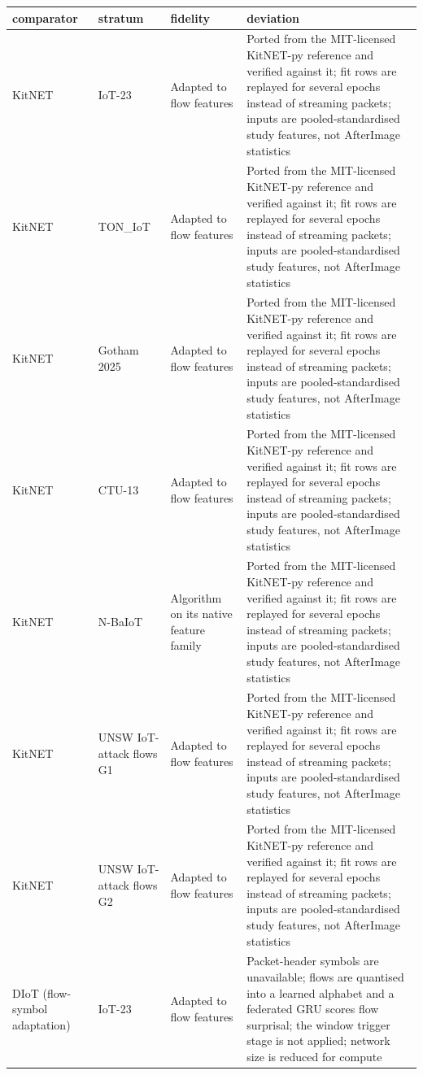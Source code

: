 \begin{tabular}{llll}
\toprule
comparator & stratum & fidelity & deviation \\
\midrule
KitNET & IoT-23 & Adapted to flow features & Ported from the MIT-licensed KitNET-py reference and verified against it; fit rows are replayed for several epochs instead of streaming packets; inputs are pooled-standardised study features, not AfterImage statistics \\
KitNET & TON\_IoT & Adapted to flow features & Ported from the MIT-licensed KitNET-py reference and verified against it; fit rows are replayed for several epochs instead of streaming packets; inputs are pooled-standardised study features, not AfterImage statistics \\
KitNET & Gotham 2025 & Adapted to flow features & Ported from the MIT-licensed KitNET-py reference and verified against it; fit rows are replayed for several epochs instead of streaming packets; inputs are pooled-standardised study features, not AfterImage statistics \\
KitNET & CTU-13 & Adapted to flow features & Ported from the MIT-licensed KitNET-py reference and verified against it; fit rows are replayed for several epochs instead of streaming packets; inputs are pooled-standardised study features, not AfterImage statistics \\
KitNET & N-BaIoT & Algorithm on its native feature family & Ported from the MIT-licensed KitNET-py reference and verified against it; fit rows are replayed for several epochs instead of streaming packets; inputs are pooled-standardised study features, not AfterImage statistics \\
KitNET & UNSW IoT-attack flows G1 & Adapted to flow features & Ported from the MIT-licensed KitNET-py reference and verified against it; fit rows are replayed for several epochs instead of streaming packets; inputs are pooled-standardised study features, not AfterImage statistics \\
KitNET & UNSW IoT-attack flows G2 & Adapted to flow features & Ported from the MIT-licensed KitNET-py reference and verified against it; fit rows are replayed for several epochs instead of streaming packets; inputs are pooled-standardised study features, not AfterImage statistics \\
DIoT (flow-symbol adaptation) & IoT-23 & Adapted to flow features & Packet-header symbols are unavailable; flows are quantised into a learned alphabet and a federated GRU scores flow surprisal; the window trigger stage is not applied; network size is reduced for compute \\

\end{tabular}
